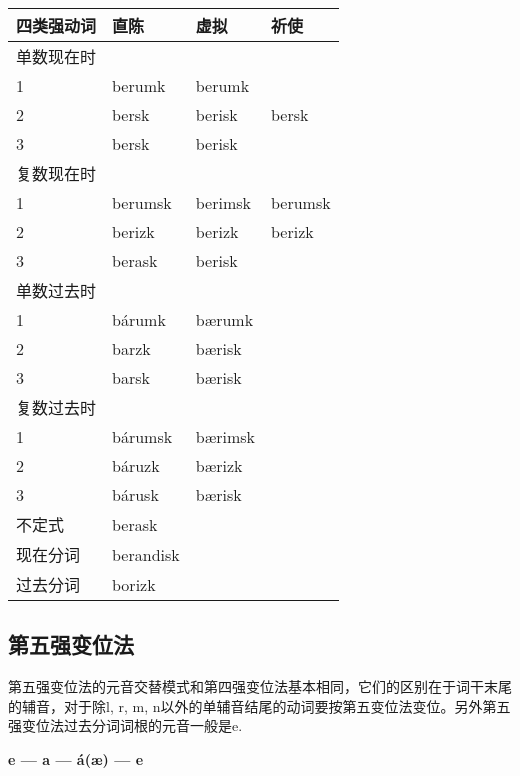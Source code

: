 \begin{longtable}{llll}
    \toprule
    四类强动词 & 直陈        & 虚拟      & 祈使      \\
    \midrule
    \endhead
    \bottomrule
    \endfoot
    单数现在时 &           &         &         \\
    1     & berumk    & berumk  &         \\
    2     & bersk     & berisk  & bersk   \\
    3     & bersk     & berisk  &         \\
    复数现在时 &           &         &         \\
    1     & berumsk   & berimsk & berumsk \\
    2     & berizk    & berizk  & berizk  \\
    3     & berask    & berisk  &         \\
    单数过去时 &           &         &         \\
    1     & bárumk    & bærumk  &         \\
    2     & barzk     & bærisk  &         \\
    3     & barsk     & bærisk  &         \\
    复数过去时 &           &         &         \\
    1     & bárumsk   & bærimsk &         \\
    2     & báruzk    & bærizk  &         \\
    3     & bárusk    & bærisk  &         \\
    不定式   & berask    &         &         \\
    现在分词  & berandisk &         &         \\
    过去分词  & borizk    &         &         \\
\end{longtable}

\subsection{第五强变位法}\label{第五强变位法}

第五强变位法的元音交替模式和第四强变位法基本相同，它们的区别在于词干末尾的辅音，对于除l, r, m, n以外的单辅音结尾的动词要按第五变位法变位。另外第五强变位法过去分词词根的元音一般是e.

\begin{center}
    \textbf{e --- a --- á(æ) --- e}
\end{center}


